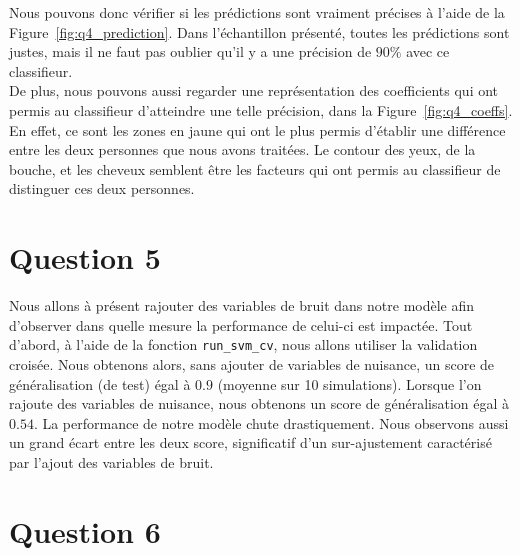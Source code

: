 \documentclass{article}
\begin{document}
Nous pouvons donc vérifier si les prédictions sont vraiment précises à l'aide de la Figure~\ref{fig:q4_prediction}. Dans l'échantillon présenté, toutes les prédictions sont justes, mais il ne faut pas oublier qu'il y a une précision de $90\%$ avec ce classifieur.\\
De plus, nous pouvons aussi regarder une représentation des coefficients qui ont permis au classifieur d'atteindre une telle précision, dans la Figure~\ref{fig:q4_coeffs}. En effet, ce sont les zones en jaune qui ont le plus permis d'établir une différence entre les deux personnes que nous avons traitées. Le contour des yeux, de la bouche, et les cheveux semblent être les facteurs qui ont permis au classifieur de distinguer ces deux personnes.

\section{Question 5}

Nous allons à présent rajouter des variables de bruit dans notre modèle afin d'observer dans quelle mesure la performance de celui-ci est impactée. Tout d'abord, à l'aide de la fonction \texttt{run\_svm\_cv}, nous allons utiliser la validation croisée. Nous obtenons alors, sans ajouter de variables de nuisance, un score de généralisation (de test) égal à $0.9$ (moyenne sur 10 simulations). Lorsque l'on rajoute des variables de nuisance, nous obtenons un score de généralisation égal à $0.54$. La performance de notre modèle chute drastiquement. Nous observons aussi un grand écart entre les deux score, significatif d'un sur-ajustement caractérisé par l'ajout des variables de bruit.

\section{Question 6}
\end{document}
